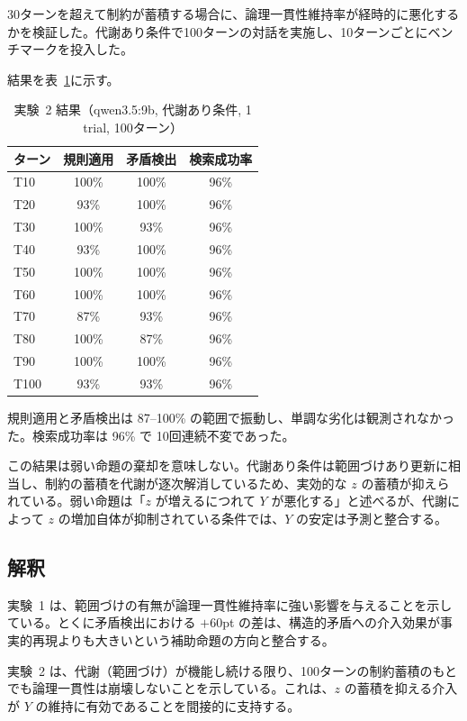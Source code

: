 \documentclass[12pt,a4paper]{article}
\begin{document}
30ターンを超えて制約が蓄積する場合に、論理一貫性維持率が経時的に悪化するかを検証した。代謝あり条件で100ターンの対話を実施し、10ターンごとにベンチマークを投入した。

結果を表~\ref{tab:exp2}に示す。

\begin{table}[htbp]
\centering
\caption{実験~2 結果（qwen3.5:9b, 代謝あり条件, 1 trial, 100ターン）}\label{tab:exp2}
\begin{tabular}{lccc}
\toprule
ターン & 規則適用 & 矛盾検出 & 検索成功率 \\
\midrule
T10  & 100\% & 100\% & 96\% \\
T20  & 93\%  & 100\% & 96\% \\
T30  & 100\% & 93\%  & 96\% \\
T40  & 93\%  & 100\% & 96\% \\
T50  & 100\% & 100\% & 96\% \\
T60  & 100\% & 100\% & 96\% \\
T70  & 87\%  & 93\%  & 96\% \\
T80  & 100\% & 87\%  & 96\% \\
T90  & 100\% & 100\% & 96\% \\
T100 & 93\%  & 93\%  & 96\% \\
\bottomrule
\end{tabular}
\end{table}

規則適用と矛盾検出は 87--100\% の範囲で振動し、単調な劣化は観測されなかった。検索成功率は 96\% で 10回連続不変であった。

この結果は弱い命題の棄却を意味しない。代謝あり条件は範囲づけあり更新に相当し、制約の蓄積を代謝が逐次解消しているため、実効的な $z$ の蓄積が抑えられている。弱い命題は「$z$ が増えるにつれて $Y$ が悪化する」と述べるが、代謝によって $z$ の増加自体が抑制されている条件では、$Y$ の安定は予測と整合する。

\subsection{解釈}

実験~1 は、範囲づけの有無が論理一貫性維持率に強い影響を与えることを示している。とくに矛盾検出における $+$60pt の差は、構造的矛盾への介入効果が事実的再現よりも大きいという補助命題の方向と整合する。

実験~2 は、代謝（範囲づけ）が機能し続ける限り、100ターンの制約蓄積のもとでも論理一貫性は崩壊しないことを示している。これは、$z$ の蓄積を抑える介入が $Y$ の維持に有効であることを間接的に支持する。
\end{document}
